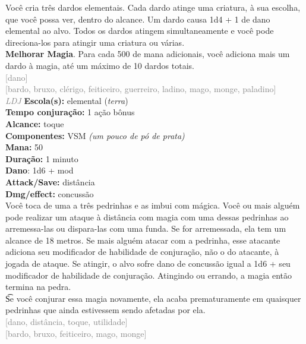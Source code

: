 \documentclass{RPG_Adventure}[2021/10/20]
\begin{document}
{\normalsize Você cria três dardos elementais. Cada dardo atinge uma criatura, à sua escolha, que você possa ver, dentro do alcance. Um dardo causa 1d4 + 1 de dano elemental ao alvo. Todos os dardos atingem simultaneamente e você pode direciona-los para atingir uma criatura ou várias.\\\t \textbf{Melhorar Magia}. Para cada 500 de mana adicionais, você adiciona mais um dardo à magia, até um máximo de 10 dardos totais.\\}
{\scriptsize \textcolor{gray}{[dano]\\}}
{\scriptsize \textcolor{gray}{[bardo, bruxo, clérigo, feiticeiro, guerreiro, ladino, mago, monge, paladino]\\}}
{\tiny \textcolor{gray}{\textit{LDJ}}}
{\small \t \textbf{Escola(s):} elemental (\textit{terra})\\\t \textbf{Tempo conjuração:} 1 ação bônus\\\t \textbf{Alcance:} toque\\\t \textbf{Componentes:} VSM \textit{(um pouco de pó de prata)}\\\t \textbf{Mana:} 50\\\t \textbf{Duração:} 1 minuto\\\t \textbf{Dano}: 1d6 + mod\\\t \textbf{Attack/Save:} distância\\\t \textbf{Dmg/effect:} concussão\\}
{\normalsize Você toca de uma a três pedrinhas e as imbui com mágica. Você ou mais alguém pode realizar um ataque à distância com magia com uma dessas pedrinhas ao arremessa-las ou dispara-las com uma funda. Se for arremessada, ela tem um alcance de 18 metros. Se mais alguém atacar com a pedrinha, esse atacante adiciona seu modificador de habilidade de conjuração, não o do atacante, à jogada de ataque. Se atingir, o alvo sofre dano de concussão igual a 1d6 + seu modificador de habilidade de conjuração. Atingindo ou errando, a magia então termina na pedra.\\\t Se você conjurar essa magia novamente, ela acaba prematuramente em quaisquer pedrinhas que ainda estivessem sendo afetadas por ela.\\}
{\scriptsize \textcolor{gray}{[dano, distância, toque, utilidade]\\}}
{\scriptsize \textcolor{gray}{[bardo, bruxo, feiticeiro, mago, monge]\\}}
\end{document}
